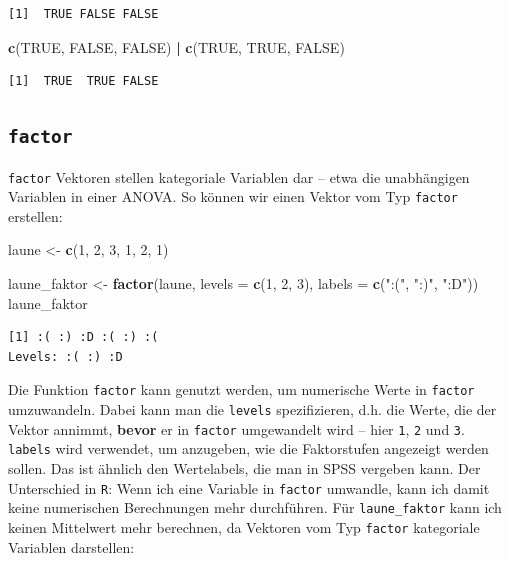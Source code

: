 \documentclass[12pt,]{tufte-book}
\newenvironment{Shaded}{\begin{snugshade}}{\end{snugshade}}
\newcommand{\KeywordTok}[1]{\textcolor[rgb]{0.13,0.29,0.53}{\textbf{#1}}}
\newcommand{\DataTypeTok}[1]{\textcolor[rgb]{0.13,0.29,0.53}{#1}}
\newcommand{\DecValTok}[1]{\textcolor[rgb]{0.00,0.00,0.81}{#1}}
\newcommand{\StringTok}[1]{\textcolor[rgb]{0.31,0.60,0.02}{#1}}
\newcommand{\OtherTok}[1]{\textcolor[rgb]{0.56,0.35,0.01}{#1}}
\newcommand{\OperatorTok}[1]{\textcolor[rgb]{0.81,0.36,0.00}{\textbf{#1}}}
\newcommand{\NormalTok}[1]{#1}
\theoremstyle{definition}
\theoremstyle{definition}
\theoremstyle{definition}
\theoremstyle{remark}
\begin{document}
\begin{verbatim}
[1]  TRUE FALSE FALSE
\end{verbatim}

\begin{Shaded}
\begin{Highlighting}[]
\KeywordTok{c}\NormalTok{(}\OtherTok{TRUE}\NormalTok{, }\OtherTok{FALSE}\NormalTok{, }\OtherTok{FALSE}\NormalTok{) }\OperatorTok{|}\StringTok{ }\KeywordTok{c}\NormalTok{(}\OtherTok{TRUE}\NormalTok{, }\OtherTok{TRUE}\NormalTok{, }\OtherTok{FALSE}\NormalTok{)}
\end{Highlighting}
\end{Shaded}

\begin{verbatim}
[1]  TRUE  TRUE FALSE
\end{verbatim}

\subsection{\texorpdfstring{\texttt{factor}}{factor}}\label{factor}

\texttt{factor} Vektoren stellen kategoriale Variablen dar -- etwa die
unabhängigen Variablen in einer ANOVA. So können wir einen Vektor vom
Typ \texttt{factor} erstellen:

\begin{Shaded}
\begin{Highlighting}[]
\NormalTok{laune <-}\StringTok{ }\KeywordTok{c}\NormalTok{(}\DecValTok{1}\NormalTok{, }\DecValTok{2}\NormalTok{, }\DecValTok{3}\NormalTok{, }\DecValTok{1}\NormalTok{, }\DecValTok{2}\NormalTok{, }\DecValTok{1}\NormalTok{)}

\NormalTok{laune_faktor <-}\StringTok{ }\KeywordTok{factor}\NormalTok{(laune, }\DataTypeTok{levels =} \KeywordTok{c}\NormalTok{(}\DecValTok{1}\NormalTok{, }\DecValTok{2}\NormalTok{, }
    \DecValTok{3}\NormalTok{), }\DataTypeTok{labels =} \KeywordTok{c}\NormalTok{(}\StringTok{":("}\NormalTok{, }\StringTok{":)"}\NormalTok{, }\StringTok{":D"}\NormalTok{))}
\NormalTok{laune_faktor}
\end{Highlighting}
\end{Shaded}

\begin{verbatim}
[1] :( :) :D :( :) :(
Levels: :( :) :D
\end{verbatim}

Die Funktion \texttt{factor} kann genutzt werden, um numerische Werte in
\texttt{factor} umzuwandeln. Dabei kann man die \texttt{levels}
spezifizieren, d.h. die Werte, die der Vektor annimmt, \textbf{bevor} er
in \texttt{factor} umgewandelt wird -- hier \texttt{1}, \texttt{2} und
\texttt{3}. \texttt{labels} wird verwendet, um anzugeben, wie die
Faktorstufen angezeigt werden sollen. Das ist ähnlich den Wertelabels,
die man in SPSS vergeben kann. Der Unterschied in \texttt{R}: Wenn ich
eine Variable in \texttt{factor} umwandle, kann ich damit keine
numerischen Berechnungen mehr durchführen. Für \texttt{laune\_faktor}
kann ich keinen Mittelwert mehr berechnen, da Vektoren vom Typ
\texttt{factor} kategoriale Variablen darstellen:
\end{document}
